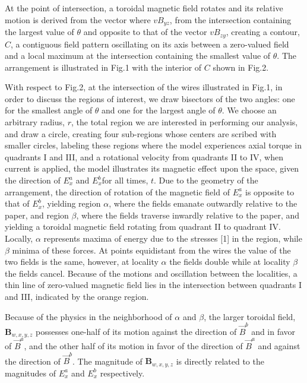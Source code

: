 \documentclass[]{article}
\begin{document}
At the point of intersection, a toroidal magnetic field rotates and its relative motion is derived from the vector where $v{{B}_{yz}}$, from the intersection containing the largest value of $\theta$ and opposite to that of the vector $v{{B}_{zy}}$, creating a contour, $C$, a contiguous field pattern oscillating on its axis between a zero-valued field and a local maximum at the intersection containing the smallest value of $\theta$. The arrangement is illustrated in Fig.1 with the interior of $C$ shown in Fig.2.

With respect to Fig.2, at the intersection of the wires illustrated in Fig.1, in order to discuss the regions of interest, we draw bisectors of the two angles: one for the smallest angle of $\theta$ and one for the largest angle of $\theta$. We choose an arbitrary radius, $r$, the total region we are interested in performing our analysis, and draw a circle, creating four sub-regions whose centers are scribed with smaller circles, labeling these regions where the model experiences axial torque in quadrants I and III, and a rotational velocity from quadrants II to IV, when current is applied, the model illustrates its magnetic effect upon the space, given the direction of $E_{x}^{a}$ and $E_{x}^{b}$for all times, $t$. Due to the geometry of the arrangement, the direction of rotation of the magnetic field of $E_{x}^{a}$ is opposite to that of $E_{x}^{b}$, yielding region $\alpha$, where the fields emanate outwardly relative to the paper, and region $\beta$, where the fields traverse inwardly relative to the paper, and yielding a toroidal magnetic field rotating from quadrant II to quadrant IV. Locally, $\alpha$ represents maxima of energy due to the stresses [1] in the region, while $\beta$ minima of these forces. At points equidistant from the wires the value of the two fields is the same, however, at locality $\alpha$ the fields double while at locality $\beta$ the fields cancel. Because of the motions and oscillation between the localities, a thin line of zero-valued magnetic field lies in the intersection between quadrants I and III, indicated by the orange region.

Because of the physics in the neighborhood of $\alpha$ and $\beta$, the larger toroidal field, ${{\mathbf{B}}_{w,x,y,z}}$ possesses one-half of its motion against the direction of ${{\vec{B}}^{b}}$ and in favor of ${{\vec{B}}^{a}}$, and the other half of its motion in favor of the direction of ${{\vec{B}}^{a}}$ and against the direction of ${{\vec{B}}^{b}}$. The magnitude of ${{\mathbf{B}}_{w,x,y,z}}$ is directly related to the magnitudes of $E_{x}^{a}$ and $E_{x}^{b}$ respectively.
\end{document}
